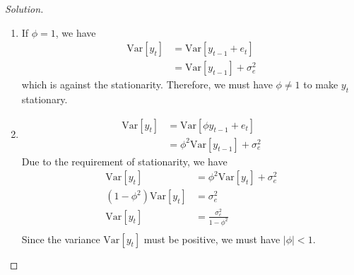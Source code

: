\documentclass[UTF8,a4paper,14pt]{ctexart}
\newcommand{\Var}{\mathrm{Var}}
\newenvironment{solution}
  {\renewcommand\qedsymbol{$\blacksquare$}\begin{proof}[Solution]}
  {\end{proof}}
\theoremstyle{definition}
\theoremstyle{remark}
\begin{document}
\begin{solution}
\begin{enumerate}[label=(\alph*)]
\begin{equation}
    \end{equation}
    \begin{mybox}{Geometric Series}
      The sum of a \(n\)-term (finite) geometric series is given by:
      \begin{equation*}
        \begin{aligned}
          S_n = \begin{cases}
            \frac {a_1(1-r^{n})}{1-r} & r\neq 1\\
            a_1n & r = 1
          \end{cases}      
        \end{aligned}
      \end{equation*}
      with initial value \(a = a_1\) and common ratio \(r\).
    \end{mybox}
    \item If \(\phi =1\), we have
    \begin{equation*}
      \begin{aligned}
        \Var[y_t] &= \Var[y_{t-1}+e_t]  \\
        &=\Var[y_{t-1}]+\sigma_e^2    
      \end{aligned}
    \end{equation*}
    which is against the stationarity. Therefore, we must have \(\phi\neq 1\) to make \(y_t\) stationary.
    \item \begin{equation*}
      \begin{aligned}
        \Var[y_t] &= \Var[\phi y_{t-1}+e_t]  \\
        &=\phi^2\Var[y_{t-1}]+\sigma_e^2    
      \end{aligned}
    \end{equation*}
    Due to the requirement of stationarity, we have
    \begin{equation*}
      \begin{aligned}
        \Var[y_t] 
        &=\phi^2\Var[y_{t}]+\sigma_e^2   \\ 
        (1-\phi^2)\Var[y_{t}]&=\sigma_e^2   \\
        \Var[y_{t}]&=\frac{\sigma_e^2 }{1-\phi^2}  \\ 
      \end{aligned}
    \end{equation*}
    Since the variance \(\Var[y_t]\) must be positive, we must have \(\left\lvert \phi\right\rvert <1\).
  \end{enumerate}

\end{solution}
\end{document}
